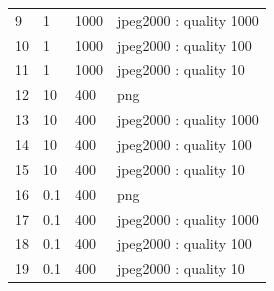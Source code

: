 \begin{table}[htb]
\begin{tabular}{l|lll}
9       & 1                                                                                                        & 1000                                                                                         & jpeg2000 : quality 1000 \\
10      & 1                                                                                                        & 1000                                                                                         & jpeg2000 : quality 100  \\
11      & 1                                                                                                        & 1000                                                                                         & jpeg2000 : quality 10   \\
12      & 10                                                                                                       & 400                                                                                          & png                     \\
13      & 10                                                                                                       & 400                                                                                          & jpeg2000 : quality 1000 \\
14      & 10                                                                                                       & 400                                                                                          & jpeg2000 : quality 100  \\
15      & 10                                                                                                       & 400                                                                                          & jpeg2000 : quality 10   \\
16      & 0.1                                                                                                      & 400                                                                                          & png                     \\
17      & 0.1                                                                                                      & 400                                                                                          & jpeg2000 : quality 1000 \\
18      & 0.1                                                                                                      & 400                                                                                          & jpeg2000 : quality 100  \\
19      & 0.1                                                                                                      & 400                                                                                          & jpeg2000 : quality 10  
\end{tabular}
\end{table}

